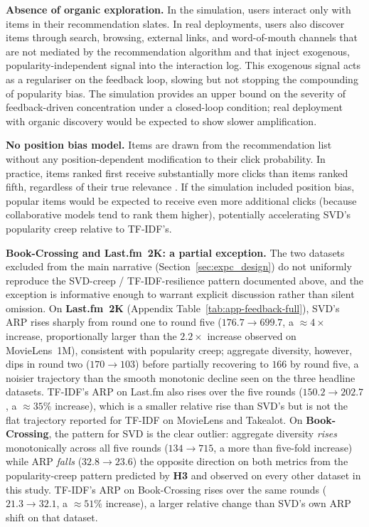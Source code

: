 \documentclass[11pt,a4paper]{report}
\begin{document}
\textbf{Absence of organic exploration.} In the simulation, users interact only with items in their recommendation slates. In real deployments, users also discover items through search, browsing, external links, and word-of-mouth channels that are not mediated by the recommendation algorithm and that inject exogenous, popularity-independent signal into the interaction log. This exogenous signal acts as a regulariser on the feedback loop, slowing but not stopping the compounding of popularity bias. The simulation provides an upper bound on the severity of feedback-driven concentration under a closed-loop condition; real deployment with organic discovery would be expected to show slower amplification.

\textbf{No position bias model.} Items are drawn from the recommendation list without any position-dependent modification to their click probability. In practice, items ranked first receive substantially more clicks than items ranked fifth, regardless of their true relevance \citep{yao2021simulatedusers}. If the simulation included position bias, popular items would be expected to receive even more additional clicks (because collaborative models tend to rank them higher), potentially accelerating SVD's popularity creep relative to TF-IDF's.

\textbf{Book-Crossing and Last.fm~2K: a partial exception.} The two datasets excluded from the main narrative (Section~\ref{sec:expc_design}) do not uniformly reproduce the SVD-creep / TF-IDF-resilience pattern documented above, and the exception is informative enough to warrant explicit discussion rather than silent omission. On \textbf{Last.fm~2K} (Appendix Table~\ref{tab:app-feedback-full}), SVD's ARP rises sharply from round one to round five ($176.7 \rightarrow 699.7$, a $\approx\!4\times$ increase, proportionally larger than the $2.2\times$ increase observed on MovieLens~1M), consistent with popularity creep; aggregate diversity, however, dips in round two ($170 \rightarrow 103$) before partially recovering to $166$ by round five, a noisier trajectory than the smooth monotonic decline seen on the three headline datasets. TF-IDF's ARP on Last.fm also rises over the five rounds ($150.2 \rightarrow 202.7$, a $\approx\!35\%$ increase), which is a smaller relative rise than SVD's but is not the flat trajectory reported for TF-IDF on MovieLens and Takealot. On \textbf{Book-Crossing}, the pattern for SVD is the clear outlier: aggregate diversity \emph{rises} monotonically across all five rounds ($134 \rightarrow 715$, a more than five-fold increase) while ARP \emph{falls} ($32.8 \rightarrow 23.6$) the opposite direction on both metrics from the popularity-creep pattern predicted by \textbf{H3} and observed on every other dataset in this study. TF-IDF's ARP on Book-Crossing rises over the same rounds ($21.3 \rightarrow 32.1$, a $\approx\!51\%$ increase), a larger relative change than SVD's own ARP shift on that dataset.
\end{document}
